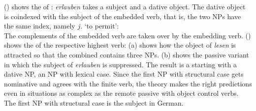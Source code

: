 () shows the \argstv of : \emph{erlauben} takes a subject and a dative
object. The dative object is coindexed with the subject of the embedded verb, that is, the two NPs
have the same index, namely $j$.
\ea
{} `to permit':\\
\z
The complements of the embedded verb  are taken over by the embedding verb. () shows
the \argstv of the respective highest verb:
\ea
\label{ex-arg-st-fernpassiv-object-control}
\z
(a) shows how the object of \emph{lesen} is attracted so that the combined \argst contains
three NPs. (b) shows the passive variant in which the subject of \emph{erlauben} is
suppressed. The result is a \argstl starting with a dative NP, an NP with lexical case. Since the
first NP with structural case gets nominative and agrees with the finite verb, the theory makes the
right predictions even in situations as complex as the remote passive with object control verbs. The
first NP with structural case is the subject in German.










